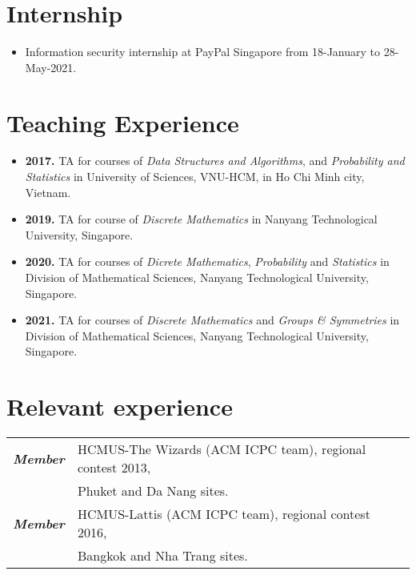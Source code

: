 \documentclass[a4paper, 11pt]{article}
\begin{document}
	\section{Internship}
	\begin{itemize}
		\item Information security internship at PayPal Singapore from 18-January to 28-May-2021.
	\end{itemize}
	
	\section{Teaching Experience}
	\begin{itemize}
		\item \textbf{2017.} TA for courses of \textit{Data Structures and Algorithms}, and \textit{Probability and Statistics} in University of Sciences, VNU-HCM, in Ho Chi Minh city, Vietnam.
		\item \textbf{2019.} TA for course of \textit{Discrete Mathematics} in Nanyang Technological University, Singapore.
		\item \textbf{2020.} TA for courses of \textit{Dicrete Mathematics}, \textit{Probability} and \textit{Statistics} in Division of Mathematical Sciences, Nanyang Technological University, Singapore.
		\item \textbf{2021.} TA for courses of \textit{Discrete Mathematics} and \textit{Groups \& Symmetries} in Division of Mathematical Sciences, Nanyang Technological University, Singapore.
	\end{itemize}
	
	\section{Relevant experience}
	\begin{tabular}{rl}
		{\sl \textbf{Member}} & HCMUS-The Wizards (ACM ICPC team), regional contest 2013,\\
		& Phuket and Da Nang sites.\\
		{\sl \textbf{Member}} & HCMUS-Lattis (ACM ICPC team), regional contest 2016,\\
		& Bangkok and Nha Trang sites. 
	\end{tabular}
	
	
	
\end{document}
